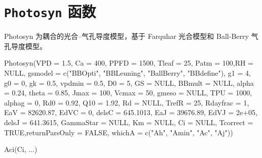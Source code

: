 \documentclass[
]{krantz}
\makeatletter
\newenvironment{Shaded}{\begin{snugshade}}{\end{snugshade}}
\newcommand{\AttributeTok}[1]{\textcolor[rgb]{0.77,0.63,0.00}{#1}}
\newcommand{\ConstantTok}[1]{\textcolor[rgb]{0.00,0.00,0.00}{#1}}
\newcommand{\DecValTok}[1]{\textcolor[rgb]{0.00,0.00,0.81}{#1}}
\newcommand{\FloatTok}[1]{\textcolor[rgb]{0.00,0.00,0.81}{#1}}
\newcommand{\FunctionTok}[1]{\textcolor[rgb]{0.00,0.00,0.00}{#1}}
\newcommand{\NormalTok}[1]{#1}
\newcommand{\StringTok}[1]{\textcolor[rgb]{0.31,0.60,0.02}{#1}}
\newenvironment{kframe}{%
\medskip{}
\setlength{\fboxsep}{.8em}
 \def\at@end@of@kframe{}%
 \ifinner\ifhmode%
  \def\at@end@of@kframe{\end{minipage}}%
  \begin{minipage}{\columnwidth}%
 \fi\fi%
 \def\FrameCommand##1{\hskip\@totalleftmargin \hskip-\fboxsep
 \colorbox{shadecolor}{##1}\hskip-\fboxsep
     \hskip-\linewidth \hskip-\@totalleftmargin \hskip\columnwidth}%
 \MakeFramed {\advance\hsize-\width
   \@totalleftmargin\z@ \linewidth\hsize
   \@setminipage}}%
 {\par\unskip\endMakeFramed%
 \at@end@of@kframe}
\renewenvironment{Shaded}{\begin{kframe}}{\end{kframe}}
\makeatother
\begin{document}
\hypertarget{photosyn}{%
\section{\texorpdfstring{\texttt{Photosyn} 函数}{Photosyn 函数}}\label{photosyn}}

Photosyn 为耦合的光合--气孔导度模型，基于 Farquhar 光合模型和 Ball-Berry 气孔导度模型。

\begin{Shaded}
\begin{Highlighting}[]
\FunctionTok{Photosyn}\NormalTok{(}\AttributeTok{VPD =} \FloatTok{1.5}\NormalTok{, }\AttributeTok{Ca =} \DecValTok{400}\NormalTok{, }\AttributeTok{PPFD =} \DecValTok{1500}\NormalTok{,}
         \AttributeTok{Tleaf =} \DecValTok{25}\NormalTok{, }\AttributeTok{Patm =} \DecValTok{100}\NormalTok{,}\AttributeTok{RH =} \ConstantTok{NULL}\NormalTok{,}
         \AttributeTok{gsmodel =} \FunctionTok{c}\NormalTok{(}\StringTok{"BBOpti"}\NormalTok{, }\StringTok{"BBLeuning"}\NormalTok{, }
                     \StringTok{"BallBerry"}\NormalTok{, }\StringTok{"BBdefine"}\NormalTok{),}
         \AttributeTok{g1 =} \DecValTok{4}\NormalTok{, }\AttributeTok{g0 =} \DecValTok{0}\NormalTok{, }\AttributeTok{gk =} \FloatTok{0.5}\NormalTok{, }\AttributeTok{vpdmin =} \FloatTok{0.5}\NormalTok{,}
         \AttributeTok{D0 =} \DecValTok{5}\NormalTok{, }\AttributeTok{GS =} \ConstantTok{NULL}\NormalTok{, }\AttributeTok{BBmult =} \ConstantTok{NULL}\NormalTok{, }
         \AttributeTok{alpha =} \FloatTok{0.24}\NormalTok{, }\AttributeTok{theta =} \FloatTok{0.85}\NormalTok{, }\AttributeTok{Jmax =} \DecValTok{100}\NormalTok{,}
         \AttributeTok{Vcmax =} \DecValTok{50}\NormalTok{, }\AttributeTok{gmeso =} \ConstantTok{NULL}\NormalTok{, }\AttributeTok{TPU =} \DecValTok{1000}\NormalTok{, }
         \AttributeTok{alphag =} \DecValTok{0}\NormalTok{, }\AttributeTok{Rd0 =} \FloatTok{0.92}\NormalTok{, }\AttributeTok{Q10 =} \FloatTok{1.92}\NormalTok{,}
         \AttributeTok{Rd =} \ConstantTok{NULL}\NormalTok{, }\AttributeTok{TrefR =} \DecValTok{25}\NormalTok{, }\AttributeTok{Rdayfrac =} \DecValTok{1}\NormalTok{, }
         \AttributeTok{EaV =} \FloatTok{82620.87}\NormalTok{, }\AttributeTok{EdVC =} \DecValTok{0}\NormalTok{, }\AttributeTok{delsC =} \FloatTok{645.1013}\NormalTok{, }
         \AttributeTok{EaJ =} \FloatTok{39676.89}\NormalTok{, }\AttributeTok{EdVJ =} \FloatTok{2e+05}\NormalTok{, }\AttributeTok{delsJ =} \FloatTok{641.3615}\NormalTok{,}
         \AttributeTok{GammaStar =} \ConstantTok{NULL}\NormalTok{, }\AttributeTok{Km =} \ConstantTok{NULL}\NormalTok{, }\AttributeTok{Ci =} \ConstantTok{NULL}\NormalTok{, }
         \AttributeTok{Tcorrect =} \ConstantTok{TRUE}\NormalTok{,}\AttributeTok{returnParsOnly =} \ConstantTok{FALSE}\NormalTok{,}
         \AttributeTok{whichA =} \FunctionTok{c}\NormalTok{(}\StringTok{"Ah"}\NormalTok{, }\StringTok{"Amin"}\NormalTok{, }\StringTok{"Ac"}\NormalTok{, }\StringTok{"Aj"}\NormalTok{))}

\FunctionTok{Aci}\NormalTok{(Ci, ...)}
\end{Highlighting}
\end{Shaded}
\end{document}
